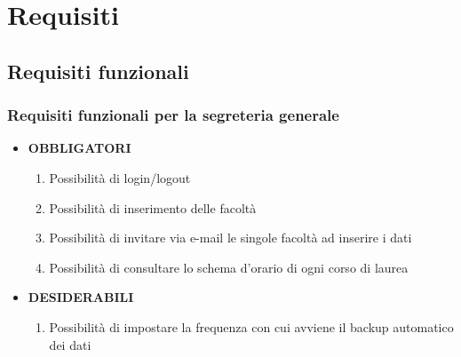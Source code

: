 \documentclass[11pt,a4paper]{article}
\begin{document}
\section{Requisiti}
\subsection{Requisiti funzionali}
\subsubsection{Requisiti funzionali per la segreteria generale}
\begin{itemize}
\item \textbf{OBBLIGATORI}
\begin{enumerate}
\item Possibilità di login/logout
\item Possibilità di inserimento delle facoltà
\item Possibilità di invitare via e-mail le singole facoltà ad inserire i dati
\item Possibilità di consultare lo schema d'orario di ogni corso di laurea
\end{enumerate}
\item \textbf{DESIDERABILI}
\begin{enumerate}
\item Possibilità di impostare la frequenza con cui avviene il backup automatico dei dati
\end{enumerate}
\end{itemize}
\end{document}
